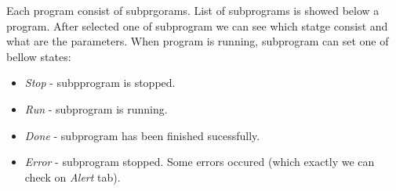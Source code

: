 Each program consist of subprgorams. List of subprograms is showed below a program. After selected one of subprogram we can see which statge consist and what are the parameters. When program is running, subprogram can set one of bellow states:

\begin{itemize}
	\item \textit{ Stop} - subpprogram is stopped. 
	\item \textit{ Run} - subprogram is running.
	\item \textit{Done} - subprogram has been finished sucessfully.
	\item \textit{Error} - subprogram stopped. Some errors occured (which exactly we can check on \textit{Alert} tab).
\end{itemize}





